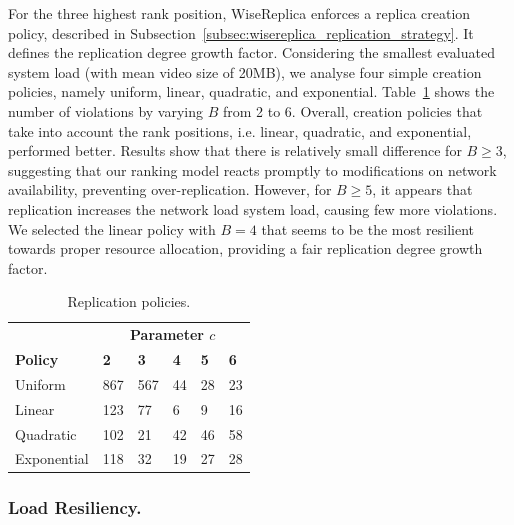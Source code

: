 For the three highest rank position, WiseReplica enforces a replica creation policy, described in Subsection~\ref{subsec:wisereplica_replication_strategy}. It defines the replication degree growth factor. Considering the smallest evaluated system load (with mean video size of 20MB), we analyse four simple creation policies, namely uniform, linear, quadratic, and exponential.  Table~\ref{tab:creation_policies} shows the number of violations by varying $B$ from 2 to 6. Overall, creation policies that take into account the rank positions, i.e. linear, quadratic, and exponential, performed better. Results show that there is relatively small difference for $B\ge 3$, suggesting that our ranking model reacts promptly to modifications on network availability, preventing over-replication. However, for $B\ge 5$, it appears that replication increases the network load system load, causing few more violations. We selected the linear policy with $B=4$ that seems to be the most resilient towards proper resource allocation, providing a fair replication degree growth factor.

\begin{table}
  \label{tab:motivation_advanced_encodings}
	\begin{center}
		\caption{Replication policies.}
  		\label{tab:creation_policies}
		\begin{tabular}{p{2cm} || p{1cm} p{1cm} p{1cm} p{1cm} p{1cm}}
			&\multicolumn{5}{c}{{\bf Parameter $c$}}\\
			{\bf Policy}&{\bf 2}&{\bf 3}&{\bf 4}&{\bf 5}&{\bf 6}\\
			\hline
			\hline
			Uniform&867&567&\cellcolor{blue!25}44&28&23\\
			\cellcolor{blue!25}Linear&\cellcolor{blue!25}123&\cellcolor{blue!25}77&\cellcolor{blue!25}6&\cellcolor{blue!25}9&\cellcolor{blue!25}16\\
			Quadratic&102&21&\cellcolor{blue!25}42&46&58\\
			Exponential&118&32&\cellcolor{blue!25}19&27&28\\
		\end{tabular}
	\end{center}
\end{table}

\subsubsection{Load Resiliency.}

